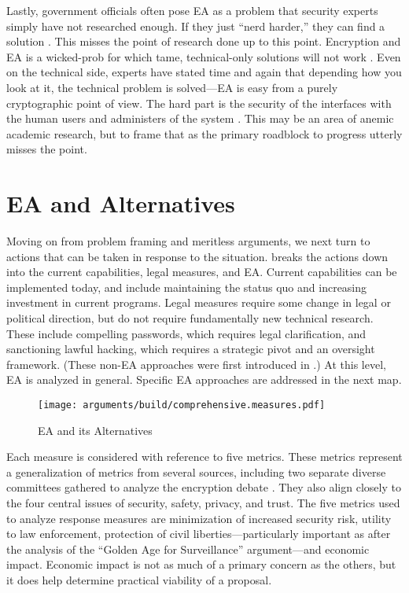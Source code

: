Lastly, government officials often pose \ac{EA} as a problem that security experts simply have not researched enough. If
they just ``nerd harder,'' they can find a solution \cite{schneier_2019}. This misses the point of research done up to
this point. Encryption and \ac{EA} is a \ac{wicked-prob} for which tame, technical-only solutions will not work
\cite{rozenshtein_wicked_2018}. Even on the technical side, experts have stated time and again that depending how you
look at it, the technical problem is solved---\ac{EA} is easy from a purely cryptographic point of view. The hard part
is the security of the interfaces with the human users and administers of the system \cite{abelson_risks_1997}
\cite{abelson_2015}. This may be an area of anemic academic research, but to frame that as the primary roadblock to
progress utterly misses the point.


\section{EA and Alternatives}

Moving on from problem framing and meritless arguments, we next turn to actions that can be taken in response to the
situation.  breaks the actions down into the current capabilities, legal measures, and \ac{EA}.
Current capabilities can be implemented today, and include maintaining the status quo and increasing investment in
current programs. Legal measures require some change in legal or political direction, but do not require fundamentally
new technical research. These include compelling passwords, which requires legal clarification, and sanctioning lawful
hacking, which requires a strategic pivot and an oversight framework. (These non-\ac{EA} approaches were first
introduced in .) At this level, \ac{EA} is analyzed in general. Specific EA approaches are
addressed in the next map.

\begin{sidewaysfigure}
  \centering\CaptionFontSize
  \texttt{[image: arguments/build/comprehensive.measures.pdf]}
  \caption{EA and its Alternatives}
  \label{fig-arg-measures}
\end{sidewaysfigure}

Each measure is considered with reference to five metrics. These metrics represent a generalization of metrics from
several sources, including two separate diverse committees gathered to analyze the encryption debate
\cite{committee_decrypting_2018} \cite{group_2019} \cite{varia_2018}. They also align closely to the four central issues
of security, safety, privacy, and trust. The five metrics used to analyze response measures are minimization of
increased security risk, utility to law enforcement, protection of civil liberties---particularly important as after the
analysis of the ``Golden Age for Surveillance'' argument---and economic impact. Economic impact is not as much of a
primary concern as the others, but it does help determine practical viability of a proposal.

